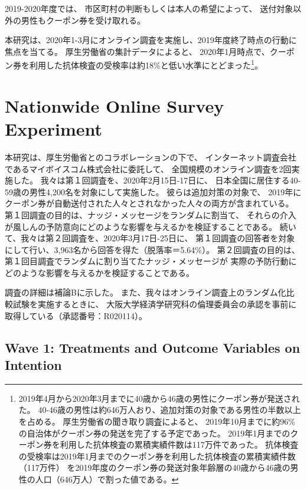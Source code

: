 \documentclass[
  11pt,
  a4paper,
]{article}
\begin{document}
2019-2020年度では、
市区町村の判断もしくは本人の希望によって、
送付対象以外の男性もクーポン券を受け取れる。

本研究は、2020年1-3月にオンライン調査を実施し、2019年度終了時点の行動に焦点を当てる。
厚生労働省の集計データによると、
2020年1月時点で、クーポン券を利用した抗体検査の受検率は約18\%と低い水準にとどまった\footnote{2019年4月から2020年3月までに40歳から46歳の男性にクーポン券が発送された。
  40-46歳の男性は約646万人おり、追加対策の対象である男性の半数以上を占める。
  厚生労働省の聞き取り調査によると、
  2019年10月までに約96\%の自治体がクーポン券の発送を完了する予定であった。
  2019年1月までのクーポン券を利用した抗体検査の累積実績件数は117万件であった。
  抗体検査の受検率は2019年1月までのクーポン券を利用した抗体検査の累積実績件数（117万件）
  を2019年度のクーポン券の発送対象年齢層の40歳から46歳の男性の人口（646万人）で割った値である。
}。

\hypertarget{experiment}{%
\section{Nationwide Online Survey Experiment}\label{experiment}}

本研究は、厚生労働省とのコラボレーションの下で、
インターネット調査会社であるマイボイスコム株式会社に委託して、
全国規模のオンライン調査を2回実施した。
我々は第１回調査を、2020年2月15日-17日に、
日本全国に居住する40-59歳の男性4,200名を対象にして実施した。
彼らは追加対策の対象で、
2019年にクーポン券が自動送付された人々とされなかった人々の両方が含まれている。
第１回調査の目的は、ナッジ・メッセージをランダムに割当て、
それらの介入が風しんの予防意向にどのような影響を与えるかを検証することである。
続いて、我々は第２回調査を、2020年3月17日-25日に、
第１回調査の回答者を対象にして行い、3,963名から回答を得た（脱落率＝5.64\%）。
第２回調査の目的は、第１回目調査でランダムに割り当てたナッジ・メッセージが
実際の予防行動にどのような影響を与えるかを検証することである。

調査の詳細は補論Bに示した。
また、我々はオンライン調査上のランダム化比較試験を実施するときに、
大阪大学経済学研究科の倫理委員会の承認を事前に取得している（承認番号：R020114）。

\hypertarget{wave1}{%
\subsection{Wave 1: Treatments and Outcome Variables on Intention}\label{wave1}}
\end{document}
